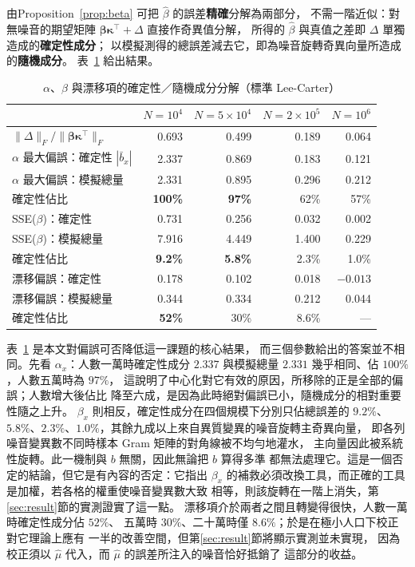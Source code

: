 \documentclass[UTF8, fontset=macnew, a4paper, 12pt]{ctexart}
\begin{document}
由Proposition~\ref{prop:beta} 可把 $\hat\beta$ 的誤差\textbf{精確}分解為兩部分，
不需一階近似：對無噪音的期望矩陣
$\boldsymbol\beta\boldsymbol\kappa^{\top}+\Delta$ 直接作奇異值分解，
所得的 $\hat\beta$ 與真值之差即 $\Delta$ 單獨造成的\textbf{確定性成分}；
以模擬測得的總誤差減去它，即為噪音旋轉奇異向量所造成的\textbf{隨機成分}。
表~\ref{tab:betadec} 給出結果。

\begin{table}[H]
\centering
\caption{$\alpha$、$\beta$ 與漂移項的確定性／隨機成分分解（標準 Lee-Carter）}
\small
\begin{tabular}{lrrrr}
\toprule
 & $N=10^4$ & $N=5\times10^4$ & $N=2\times10^5$ & $N=10^6$\\
\midrule
$\|\Delta\|_F/\|\boldsymbol\beta\boldsymbol\kappa^{\top}\|_F$
 & 0.693 & 0.499 & 0.189 & 0.064\\
\midrule
$\alpha$ 最大偏誤：確定性 $|\bar b_x|$ & 2.337 & 0.869 & 0.183 & 0.121\\
$\alpha$ 最大偏誤：模擬總量 & 2.331 & 0.895 & 0.296 & 0.212\\
\quad 確定性佔比 & \textbf{100\%} & \textbf{97\%} & 62\% & 57\%\\
\midrule
SSE($\beta$)：確定性 & 0.731 & 0.256 & 0.032 & 0.002\\
SSE($\beta$)：模擬總量 & 7.916 & 4.449 & 1.400 & 0.229\\
\quad 確定性佔比 & \textbf{9.2\%} & \textbf{5.8\%} & 2.3\% & 1.0\%\\
\midrule
漂移偏誤：確定性 & 0.178 & 0.102 & 0.018 & $-0.013$\\
漂移偏誤：模擬總量 & 0.344 & 0.334 & 0.212 & 0.044\\
\quad 確定性佔比 & \textbf{52\%} & 30\% & 8.6\% & ---\\
\bottomrule
\end{tabular}
\label{tab:betadec}
\end{table}

表~\ref{tab:betadec} 是本文對偏誤可否降低這一課題的核心結果，
而三個參數給出的答案並不相同。先看 $\alpha_x$：人數一萬時確定性成分
$2.337$ 與模擬總量 $2.331$ 幾乎相同、佔 $100\%$，人數五萬時為 $97\%$，
這說明了中心化對它有效的原因，所移除的正是全部的偏誤；人數增大後佔比
降至六成，是因為此時絕對偏誤已小，隨機成分的相對重要性隨之上升。
$\beta_x$ 則相反，確定性成分在四個規模下分別只佔總誤差的 $9.2\%$、
$5.8\%$、$2.3\%$、$1.0\%$，其餘九成以上來自異質變異的噪音旋轉主奇異向量，
即各列噪音變異數不同時樣本 Gram 矩陣的對角線被不均勻地灌水，
主向量因此被系統性旋轉。此一機制與 $b$ 無關，因此無論把 $b$ 算得多準
都無法處理它。這是一個否定的結論，但它是有內容的否定：它指出 $\beta_x$
的補救必須改換工具，而正確的工具是加權，若各格的權重使噪音變異數大致
相等，則該旋轉在一階上消失，第\ref{sec:result}節的實測證實了這一點。
漂移項介於兩者之間且轉變得很快，人數一萬時確定性成分佔 $52\%$、
五萬時 $30\%$、二十萬時僅 $8.6\%$；於是在極小人口下校正對它理論上應有
一半的改善空間，但第\ref{sec:result}節將顯示實測並未實現，
因為校正須以 $\hat\mu$ 代入，而 $\hat\mu$ 的誤差所注入的噪音恰好抵銷了
這部分的收益。
\end{document}
